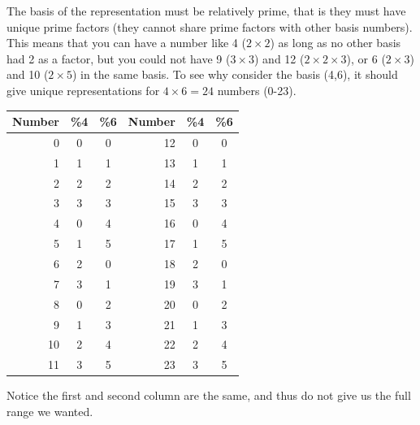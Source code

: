 The basis of the representation must be relatively prime, that is they must have unique prime factors (they cannot share prime factors with other basis numbers).  This means that you can have a number like 4 ($2\times 2$) as long as no other basis had 2 as a factor, but you could not have 9 ($3\times 3$) and 12 ($2\times 2\times 3$), or 6 ($2\times 3$) and 10 ($2\times 5$) in the same basis.  To see why consider the basis (4,6), it should give unique representations for $4\times 6=24$ numbers (0-23).

\begin{tabular}{|r|cc||r|cc|} \hline
  Number & \%4 & \%6 & Number & \%4 & \%6 \\ \hline
  0      & 0   & 0   & 12     & 0   & 0   \\
  1      & 1   & 1   & 13     & 1   & 1   \\ \hline
  2      & 2   & 2   & 14     & 2   & 2   \\
  3      & 3   & 3   & 15     & 3   & 3   \\ \hline
  4      & 0   & 4   & 16     & 0   & 4   \\
  5      & 1   & 5   & 17     & 1   & 5   \\ \hline
  6      & 2   & 0   & 18     & 2   & 0   \\
  7      & 3   & 1   & 19     & 3   & 1   \\ \hline
  8      & 0   & 2   & 20     & 0   & 2   \\
  9      & 1   & 3   & 21     & 1   & 3   \\ \hline
  10     & 2   & 4   & 22     & 2   & 4   \\
  11     & 3   & 5   & 23     & 3   & 5   \\ \hline
\end{tabular}

Notice the first and second column are the same, and thus do not give us the full range we wanted.
